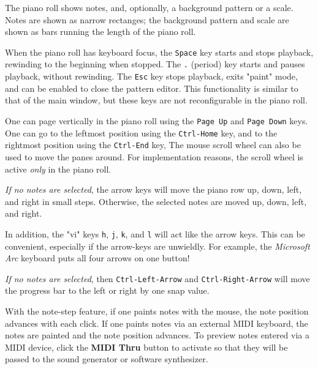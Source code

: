    The piano roll shows notes, and, optionally, a background pattern or a
   scale.  Notes are shown as narrow rectanges; the background
   pattern and scale are shown as bars running the length of the piano roll.

   When the piano roll has keyboard focus, the \texttt{Space} key
   starts and stops playback, rewinding to the beginning when stopped.
   The \texttt{.} (period) key starts and pauses playback, without
   rewinding.
   The \texttt{Esc} key stops playback, exits "paint" mode, and
   can be enabled to close the pattern editor.
   This functionality is similar to that of the main window, but
   these keys are not reconfigurable in the piano roll.

   One can page vertically in the piano roll using the
    \texttt{Page Up} and 
    \texttt{Page Down} keys.
   One can go to the leftmost position using the 
    \texttt{Ctrl-Home} key,
   and to the rightmost position using the
    \texttt{Ctrl-End} key,
   The mouse scroll wheel can also be used to move the panes around.
   For implementation reasons, the scroll wheel is active
   \textsl{only} in the piano roll.

   \textsl{If no notes are selected}, the arrow keys will move the piano row
   up, down, left, and right in small steps.
   Otherwise, the selected notes are moved
   up, down, left, and right.

   In addition, the "vi" keys \texttt{h}, \texttt{j}, \texttt{k}, and
   \texttt{l} will act like the arrow keys. This can be convenient, especially
   if the arrow-keys are unwieldly.  For example, the
   \textsl{Microsoft Arc} keyboard puts all four arrows on one button!

   \textsl{If no notes are selected}, then \texttt{Ctrl-Left-Arrow}
   and \texttt{Ctrl-Right-Arrow} will move the progress bar to the left or
   right by one snap value.

   With the note-step feature, if one paints notes with the mouse,
   the note position advances with each click.
   If one paints notes via an external MIDI keyboard, the notes are painted and
   the note position advances.
   To preview notes entered via a MIDI device, click the
   \textbf{MIDI Thru} button to activate so that they will be
   passed to the sound generator or software synthesizer.

